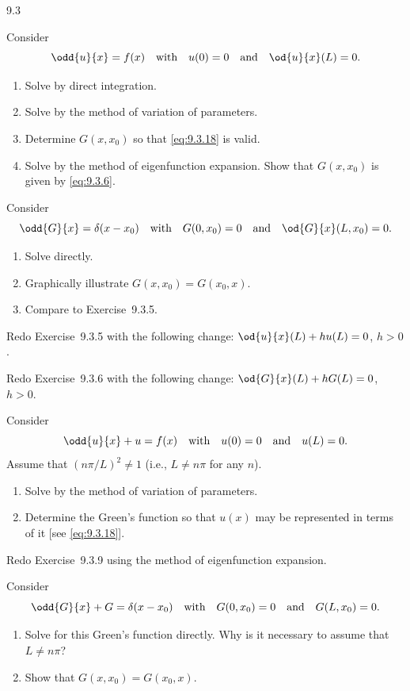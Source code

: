 \begin{exercises}{9.3}
\item Consider
\[
\odd{u}{x} = f(x) \quad\text{with}\quad u(0)=0 \quad\text{and}\quad \od{u}{x}(L) = 0.
\]
\begin{enumerate}
\item[\starred(a)] Solve by direct integration.
\item[\starred(b)] Solve by the method of variation of parameters.
\item[\starred(c)] Determine $G(x,x_0)$ so that \eqref{eq:9.3.18} is valid.
\item[(d)] Solve by the method of eigenfunction expansion.  Show that $G(x,x_0)$ is given by \eqref{eq:9.3.6}.
\end{enumerate}

\item Consider
\[
\odd{G}{x} = \delta(x - x_0) \quad\text{with}\quad G(0,x_0) = 0 \quad\text{and}\quad \od{G}{x}(L,x_0) = 0.
\]
\begin{enumerate}
\item[\starred(a)] Solve directly.
\item[\starred(b)] Graphically illustrate $G(x,x_0) = G(x_0,x)$.
\item[(c)] Compare to Exercise~9.3.5.
\end{enumerate}

\item Redo Exercise~9.3.5 with the following change: $\od{u}{x}(L) + hu(L) = 0$, $h > 0$.

\item Redo Exercise~9.3.6 with the following change: $\od{G}{x}(L) + hG(L) = 0$, $h > 0$.

\item Consider
\[
\odd{u}{x} + u = f(x) \quad\text{with}\quad u(0)=0 \quad\text{and}\quad u(L) = 0.
\]
Assume that $(n\pi/L)^2 \neq 1$ (i.e., $L \neq n\pi$ for any $n$).
\begin{enumerate}
\item[(a)] Solve by the method of variation of parameters.
\item[\starred(b)] Determine the Green's function so that $u(x)$ may be represented in terms of it [see \eqref{eq:9.3.18}].
\end{enumerate}

\item Redo Exercise~9.3.9 using the method of eigenfunction expansion.

\item Consider
\[
\odd{G}{x} + G = \delta(x-x_0) \quad\text{with}\quad G(0,x_0) = 0 \quad\text{and}\quad G(L,x_0) = 0.
\]
\begin{enumerate}
\item[\starred(a)] Solve for this Green's function directly.  Why is it necessary to assume that $L \neq n\pi$?
\item[(b)] Show that $G(x,x_0) = G(x_0,x)$.
\end{enumerate}


\end{exercises}
